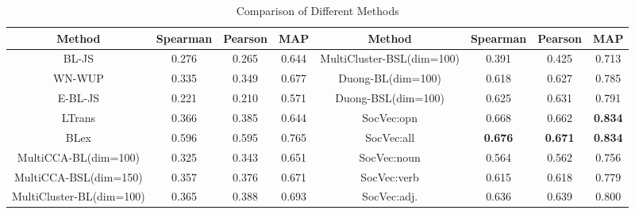 \begin{table}[t]
	\scriptsize
	\centering
	\caption{{Comparison of Different Methods}}
	\begin{tabular}{c|c|c|c|c|c|c|c}
		\textbf{Method} & \textbf{Spearman} & \textbf{Pearson}  & \textbf{MAP} &\textbf{Method} & \textbf{Spearman} & \textbf{Pearson}  & \textbf{MAP} \\ \hline
		BL-JS& 0.276 & 0.265 & 0.644 & MultiCluster-BSL(dim=100)&0.391&0.425&0.713  \\ 
		WN-WUP  & 0.335 & 0.349 & 0.677 & Duong-BL(dim=100)&0.618&0.627&0.785 \\ 
		E-BL-JS & 0.221 & 0.210  & 0.571 & Duong-BSL(dim=100)&0.625&0.631&0.791 \\ 
		LTrans& 0.366 & 0.385  & 0.644 &SocVec:opn& 0.668 & 0.662   & \textbf{0.834}  \\
		BLex& 0.596 & 0.595  & 0.765 & SocVec:all& \textbf{0.676} & \textbf{0.671}  & \textbf{0.834} \\
MultiCCA-BL(dim=100)&0.325&0.343&0.651 & SocVec:noun & 0.564 & 0.562 & 0.756\\  
MultiCCA-BSL(dim=150)&0.357&0.376&0.671 & SocVec:verb & 0.615 & 0.618 & 0.779\\ 
MultiCluster-BL(dim=100)&0.365&0.388&0.693&SocVec:adj. & 0.636 & 0.639 & 0.800\\ 
	\end{tabular}
	\label{tab:mcdne_res_1}
\end{table}


